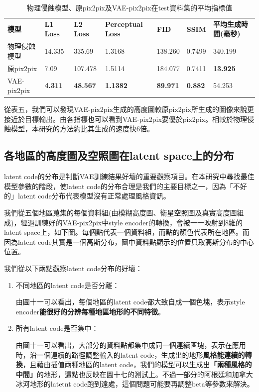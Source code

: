 \documentclass[a4paper, 12pt]{article}
\begin{document}
\begin{table}[htbp]
    \caption{物理侵蝕模型、原pix2pix及VAE-pix2pix在test資料集的平均指標值}
    \label{tab:7}
    \begin{tabularx}{\linewidth}{|Y|Y|Y|Y|Y|Y|Y|}
        \hline
        \textbf{模型} & \textbf{L1 Loss} & \textbf{L2 Loss} & \textbf{Perceptual Loss} & \textbf{FID}    & \textbf{SSIM}  & \textbf{平均生成時間(毫秒)} \\ \hhline{|=|=|=|=|=|=|=|}
        物理侵蝕模型  & 14.335            & 335.69          & 1.3168 & 138.260 & 0.7499         & 340.199                       \\ \hline
        原pix2pix     & 7.09            & 107.478         & 1.5114 & 184.077 & 0.7411         & \textbf{13.925}              \\ \hline
        VAE-pix2pix   & \textbf{4.311}   & \textbf{48.567}   & \textbf{1.1382}           & \textbf{89.971} & \textbf{0.882} & 54.253                     \\ \hline
    \end{tabularx}
\end{table}

從表五，我們可以發現VAE-pix2pix生成的高度圖較原pix2pix所生成的圖像來說更接近於目標輸出。由各指標也可以看到VAE-pix2pix要優於pix2pix。相較於物理侵蝕模型，本研究的方法約比其生成的速度快6倍。

\subsection{各地區的高度圖及空照圖在latent space上的分布}
latent code的分布是判斷VAE訓練結果好壞的重要觀察項目。在本研究中尋找最佳模型參數的階段，使latent code的分布合理是我們的主要目標之一，因為「不好的」latent code分布代表模型沒有正常處理風格資訊。

我們從五個地區蒐集的每個資料組(由模糊高度圖、衛星空照圖及真實高度圖組成)，經過訓練好的VAE-pix2pix中style encoder的轉換，會被一一映射到8維的latent space上，如下圖。每個點代表一個資料組，而點的顏色代表所在地區。而因為latent code其實是一個高斯分布，圖中資料點顯示的位置只取高斯分布的中心位置。

我們從以下兩點觀察latent code分布的好壞：
\begin{enumerate}
\item 不同地區的latent code是否分離：

由圖十一可以看出，每個地區的latent code都大致自成一個色塊，表示style encoder\textbf{能很好的分辨每種地區地形的不同特徵}。

\item 所有latent code是否集中：

由圖十一可以看出，大部分的資料點都集中成同一個連續區塊，表示在應用時，沿一個連續的路徑調整輸入的latent code，生成出的地形\textbf{風格能連續的轉換}，且藉由插值兩種地區的latent code，我們的模型可以生成出\textbf{「兩種風格的中間」}的地形，這點也反映在圖十七的測試上。不過一部分的阿根廷和加拿大冰河地形的latetnt code跑到遠處，這個問題可能要再調整beta等參數來解決。
\end{enumerate}
\end{document}
